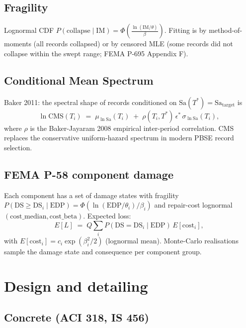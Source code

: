\documentclass[11pt,a4paper]{report}
\begin{document}
\section{Fragility}

Lognormal CDF $P(\mathrm{collapse} \mid \mathrm{IM}) = \Phi\!\left(
\frac{\ln(\mathrm{IM} / \theta)}{\beta} \right)$.  Fitting is by
method-of-moments (all records collapsed) or by censored MLE
(some records did not collapse within the swept range; FEMA P-695
Appendix F).

\section{Conditional Mean Spectrum}

Baker 2011: the spectral shape of records conditioned on $\mathrm{Sa}(T^*)
= \mathrm{Sa}_{\mathrm{target}}$ is
\begin{equation}
  \ln \mathrm{CMS}(T_i) \;=\; \mu_{\ln \mathrm{Sa}}(T_i)
  \;+\; \rho(T_i, T^*) \, \epsilon^* \, \sigma_{\ln \mathrm{Sa}}(T_i),
\end{equation}
where $\rho$ is the Baker-Jayaram 2008 empirical inter-period
correlation.  CMS replaces the conservative uniform-hazard spectrum
in modern PBSE record selection.

\section{FEMA P-58 component damage}

Each component has a set of damage states with fragility
$P(\mathrm{DS} \geq \mathrm{DS}_i \mid \mathrm{EDP}) = \Phi(\ln(
\mathrm{EDP} / \theta_i) / \beta_i)$ and repair-cost lognormal
$(\mathrm{cost\_median}, \mathrm{cost\_beta})$.  Expected loss:
\begin{equation}
  E[L] \;=\; Q \sum_i P(\mathrm{DS} = \mathrm{DS}_i \mid \mathrm{EDP}) \,
  E[\mathrm{cost}_i],
\end{equation}
with $E[\mathrm{cost}_i] = c_i \exp(\beta_i^2 / 2)$ (lognormal mean).
Monte-Carlo realisations sample the damage state and consequence per
component group.

\chapter{Design and detailing}
\label{ch:design}

\section{Concrete (ACI 318, IS 456)}
\end{document}
